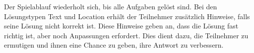 Der Spielablauf wiederholt sich, bis alle Aufgaben gelöst sind. Bei den Lösungstypen Text und Location erhält der Teilnehmer zusätzlich Hinweise, falls seine Lösung nicht korrekt ist. Diese Hinweise geben an, dass die Lösung fast richtig ist, aber noch Anpassungen erfordert. Dies dient dazu, die Teilnehmer zu ermutigen und ihnen eine Chance zu geben, ihre Antwort zu verbessern.




